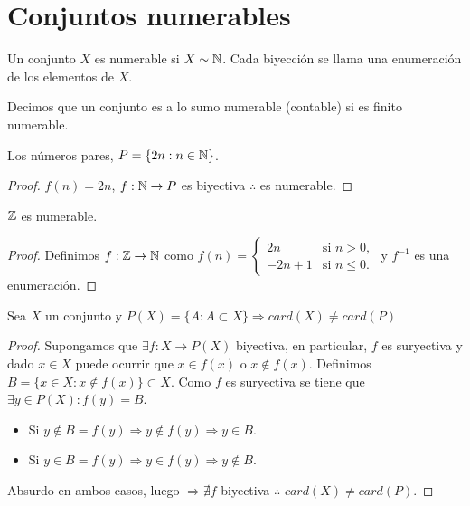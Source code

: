 \section{Conjuntos numerables}

\begin{definition}
    Un conjunto \(X\) es numerable si \(X \sim \mathbb{N} \). Cada biyección se llama una enumeración de los elementos de \(X\).
\end{definition}

\begin{definition}
    Decimos que un conjunto es a lo sumo numerable (contable) si es finito numerable.
\end{definition}

\begin{eg}
    Los números pares, \(P = \{ 2n:n \in \mathbb{N} \} \).
    \begin{proof}
        \(f(n) = 2n\), \(f: \mathbb{N} \to P\) es biyectiva \(\therefore \) es numerable.
    \end{proof}
\end{eg}

\begin{eg}
    \(\mathbb{Z} \) es numerable.
    \begin{proof}
        Definimos \(f: \mathbb{Z} \to \mathbb{N} \) como \(f(n) = \begin{cases}
                2n    & \text{si } n >0,     \\
                -2n+1 & \text{si } n \leq 0.
            \end{cases} \) y \(f^{-1} \) es una enumeración.
    \end{proof}
\end{eg}

\begin{theorem}
    Sea \(X\) un conjunto y \(P(X) = \{ A : A \subset X \} \Rightarrow card(X) \neq card(P)\)
    \begin{proof}
        Supongamos que \(\exists f:X \to P(X)\) biyectiva, en particular, \(f\) es suryectiva y dado \(x \in X \) puede ocurrir que \(x \in f(x)\) o \(x \notin f(x)\). Definimos \(B = \{ x \in X: x \notin f(x) \} \subset X\). Como \(f\) es suryectiva se tiene que \(\exists y \in P(X): f(y) = B\).\begin{itemize}
            \item Si \(y \notin B=f(y) \Rightarrow y \notin f(y) \Rightarrow y \in B\).
            \item Si \(y \in B = f(y) \Rightarrow y \in f(y) \Rightarrow y \notin B\).
        \end{itemize}
        Absurdo en ambos casos, luego \(\Rightarrow \nexists f\) biyectiva \(\therefore \) \(card(X) \neq card(P)\).
    \end{proof}
\end{theorem}

